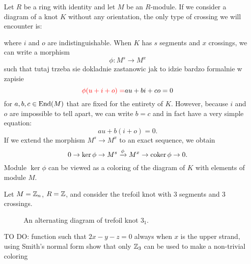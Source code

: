 Let $R$ be a ring with identity and let $M$ be an $R$-module. If we consider a diagram of a knot $K$ without any orientation, the only type of crossing we will encounter is:
\begin{center}
\end{center}
where $i$ and $o$ are indistinguishable. When $K$ has $s$ segments and $x$ crossings, we can write a morphism
$$\phi:M^s\to M^x$$
such that 
{\color{blue}tutaj trzeba sie dokladnie zastanowic jak to idzie bardzo formalnie w zapisie}
$${\color{red}\phi(u+i+o)=}au+bi+co=0$$
for $a, b, c\in \operatorname{End}(M)$ that are fixed for the entirety of $K$. However, because $i$ and $o$ are impossible to tell apart, we can write $b=c$ and in fact have a very simple equation:
$$au+b(i+o)=0.$$
If we extend the morphism $M^s\to M^x$ to an exact sequence, we obtain
$$0\to \ker\phi\to M^s\xrightarrow{\phi}M^x\to \operatorname{coker}\phi\to 0.$$
Module $\ker\phi$ can be viewed as a coloring of the diagram of $K$ with elements of module $M$.

\begin{example}
  Let $M=\operatorname{\mathbb{Z}}_n$, $R=\operatorname{\mathbb{Z}}$, and consider the trefoil knot with $3$ segments and $3$ crossings.

  \begin{figure}[h] \centering
  \caption{An alternating diagram of trefoil knot $3_1$.}
\end{figure}

{\color{orange}TO DO: function such that $2x-y-z=0$ always when $x$ is the upper strand, using Smith's normal form show that only $\operatorname{\mathbb{Z}}_3$ can be used to make a non-trivial coloring}
\end{example}












